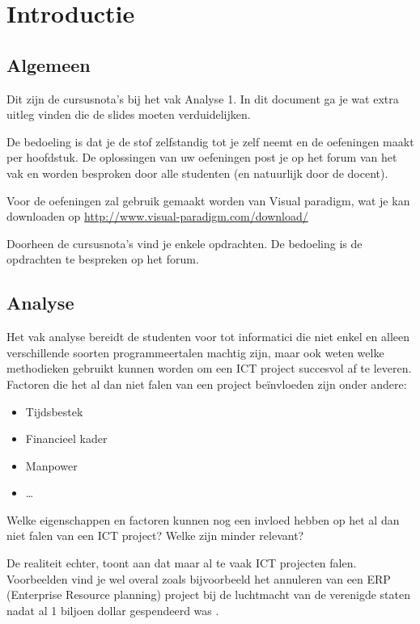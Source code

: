 \chapter{Introductie}

\section{Algemeen}
Dit zijn de cursusnota's bij het vak Analyse 1. In dit document ga je wat extra uitleg vinden die de slides moeten verduidelijken. 

De bedoeling is dat je de stof zelfstandig tot je zelf neemt en de oefeningen maakt per hoofdstuk. De oplossingen van uw oefeningen post je op het forum van het vak en worden besproken door alle studenten (en natuurlijk door de docent). 

Voor de oefeningen zal gebruik gemaakt worden van Visual paradigm, wat je kan downloaden op 
%
\url{http://www.visual-paradigm.com/download/}

Doorheen de cursusnota's vind je enkele opdrachten. De bedoeling is de opdrachten te bespreken op het forum. 

\section{Analyse}
Het vak analyse bereidt de studenten voor tot informatici die niet enkel en alleen verschillende soorten programmeertalen machtig zijn, maar ook weten welke methodieken gebruikt kunnen worden om een ICT project succesvol af te leveren. Factoren die het al dan niet falen van een project be\"invloeden zijn onder andere:

\begin{itemize}
	\item Tijdsbestek
	\item Financieel kader
	\item Manpower
	\item \dots
\end{itemize}

\begin{exercise}
	Welke eigenschappen en factoren kunnen nog een invloed hebben op het al dan niet falen van een ICT project? Welke zijn minder relevant?
\end{exercise}

De realiteit echter, toont aan dat maar al te vaak ICT projecten falen. Voorbeelden vind je wel overal zoals bijvoorbeeld het annuleren van een ERP (Enterprise Resource planning) project bij de luchtmacht van de verenigde staten nadat al 1 biljoen dollar gespendeerd was \cite{Kanaracus2012} \cite{failedProjects}.

